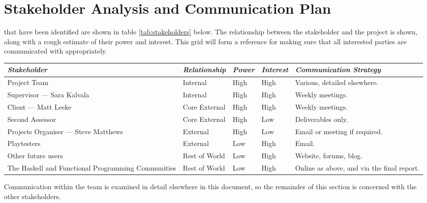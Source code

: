 \chapter[Stakeholder Analysis and Communication Plan]{Stakeholder Analysis and Communication Plan}
\label{ch:communication}

 that have been identified are shown in table \ref{tab:stakeholders} below. The relationship between the stakeholder and the project is shown, along with a rough estimate of their power and interest. This grid will form a reference for making sure that all interested parties are communicated with appropriately.

\vspace{1em}

\begin{table*}
	\small
	\renewcommand{\arraystretch}{1.2}
	\begin{tabular}{p{20em} p{7em} p{3em} p{3em} p{13em}}
		\toprule
		\emph{Stakeholder} & \emph{Relationship} & \emph{Power} & \emph{Interest} & \emph{Communication Strategy} \\
		\midrule
		
		Project Team & Internal & High & High & 
		 Various, detailed elsewhere. \\
		Supervisor --- Sara Kalvala & Internal & High & High &
		 Weekly meetings. \\
		Client --- Matt Leeke & Core External & High & High &
		 Weekly meetings. \\
		Second Assessor & Core External & High & Low &
		 Deliverables only. \\
		Projects Organiser --- Steve Matthews & External &
		 High & Low & Email or meeting if required. \\
		Playtesters & External & Low & High & Email. \\
		Other future users & Rest of World & Low &
		 High & Website, forums, blog. \\
		The Haskell and Functional Programming Communities & Rest of World & Low &
		 High & Online as above, and via the final report. \\
		\bottomrule
	\end{tabular}
	\vspace{1.5em}
	\caption{Stakeholders for the project.}
	\label{tab:stakeholders}
\end{table*}

\noindent Communication within the team is examined in detail elsewhere in this document, so the remainder of this section is concerned with the other stakeholders.

